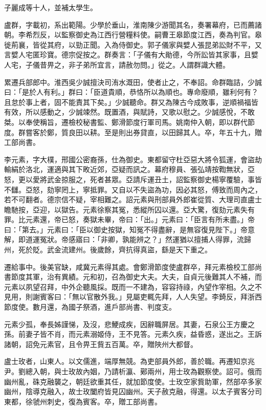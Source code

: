 \begin{pinyinscope}
 子麗成等十人，並補太學生。



 盧群，字載初，系出範陽。少學於垂山，淮南陳少游聞其名，奏署幕府，已而薦諸朝。李希烈反，以監察御史為江西行營糧料使。嗣曹王皋節度江西，奏為判官。皋徙荊襄，皆從其府，以勁正聞。入為侍御史。郭子儀家與嬖人張昆弟訟財不平，又言嬖人宅匿珍寶。德宗促按之。群奏言：「子儀有大勛德，今所訟皆其家事，且嬖人宅，子儀昔畀之，非子弟所宜言，請赦勿問。」從之。人謂群識大體。



 累遷兵部郎中。淮西吳少誠擅決司洧水溉田，使者止之，不奉詔。命群臨詰，少誠曰：「是於人有利。」群曰：「臣道貴順，恭恪所以為順也。專命廢順，雖利何有？且怠於事上者，固不能責其下矣。」少誠聽命。群又為陳古今成敗事，逆順禍福皆有效，所以感動之，少誠竦然。既置酒，與賦詩，又歌以慰之。少誠感悅，不敢桀。以奉使稱旨，遷檢校秘書監、鄭滑節度行軍司馬。姚南仲入朝，即以群代節度。群嘗客於鄭，質良田以耕。至是則出券貸直，以田歸其人。卒，年五十九，贈工部尚書。



 李元素，字大樸，邢國公密裔孫，仕為御史。東都留守杜亞惡大將令狐運，會盜劫輸絹於洛北，運適與其下畋近郊，亞疑而訊之。幕府穆員、張弘靖按鞫無狀，亞怒，更以愛將武金掠服之，死者甚眾。亞請斥運丑土，詔監察御史楊寧覆驗，事皆不讎。亞怒，劾寧罔上，寧抵罪。又自以不失盜為功，因必其怒，傅致而周內之，若不可翻者。德宗信不疑，宰相難之。詔元素與刑部員外郎崔從質、大理司直盧士瞻馳按，亞迎，以獄告。元素徐察其冤，悉縱所囚以還。亞大驚，復劾元素失有罪。比元素還，帝已怒，奏獄未畢，帝曰：「出。」元素曰：「臣言有所未盡。」帝曰：「第去。」元素曰：「臣以御史按獄，知冤不得盡辭，是無容復見陛下。」帝意解，即道運冤狀。帝感寤曰：「非卿，孰能辨之？」然運猶以擅捕人得罪，流歸州，死於貶。武金流建州。後歲餘，齊抗得真盜，繇是天下重之。



 遷給事中。後美官缺，咸冀元素得其處。會鄭滑節度使盧群卒，拜元素檢校工部尚書節度其軍，治有異績。元和初，召為御史大夫。大夫，自貞元後難其人不補，而元素以夙望召拜，中外企聽風採。既而一不建為，容容持祿，內望作宰相。久之不見用，則謝賓客曰：「無以官散外我。」見屬吏輒先拜，人人失望。李錡反，拜浙西節度使。數月還，為國子祭酒，進戶部尚書、判度支。



 元素少孤，奉長姊謹悌，及沒，悲鯁成疾，因辭職屏居。其妻，石泉公王方慶之孫。前妻子皆不肖，而元素溺姬侍，王不見答。元素久疾，益昏惑，遂出之。王訴諸朝，詔免元素官，且令畀王貲五百萬。卒，贈陜州大都督。



 盧士玫者，山東人。以文儒進，端厚無競。為吏部員外郎，善於職。再遷知京兆尹。劉總入朝，與士玫故內姻，乃請析瀛、鄚兩州，用士玫為觀察使。詔可。俄而幽州亂，硃克融襲之，朝廷欲重其任，就加節度使。士玫空家貲助軍，然部卒多家幽州，陰導克融入，故士玫闔府皆見囚幽州。天子赦克融，得還。以太子賓客分司東都，徐虢州刺史，復為賓客。卒，贈工部尚書。



\end{pinyinscope}
